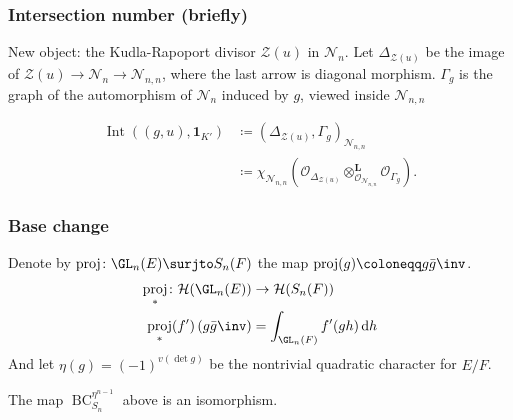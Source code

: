 \documentclass[11pt]{beamer}
\DeclareMathOperator{\BC}{BC}
\DeclareMathOperator{\Int}{Int}
\DeclareMathOperator{\Sat}{Satake}
\DeclareMathOperator{\U}{U}
\DeclareMathOperator{\rproj}{proj}
\newcommand{\HH}{\mathcal{H}}
\newcommand{\VV}{\mathbb{V}}
\newcommand{\RZ}{\mathcal{N}}
\newcommand{\Sheaf}{\mathcal O}
\newcommand{\ZD}{\mathcal{Z}}
\newcommand{\jiao}{\mathop{\otimes}^{\mathbf{L}}} %
\begin{document}
\begin{frame}
  \frametitle{Intersection number (briefly)}
  \begin{itemize}
    \ii New object: the \alert{Kudla-Rapoport divisor $\ZD(u)$} in $\RZ_n$.
    \ii Let $\Delta_{\ZD(u)}$ be the image of $\ZD(u) \to \RZ_n \to \RZ_{n,n}$,
    where the last arrow is diagonal morphism.
    \ii $\Gamma_g$ is the graph of the automorphism of $\RZ_n$ induced by $g$,
    viewed inside $\RZ_{n,n}$
  \end{itemize}
  \begin{definition}
    \begin{align*}
      \Int((g,u), \mathbf{1}_{K'})
      &\coloneqq \left( \Delta_{\ZD(u)}, \Gamma_g \right)_{\RZ_{n,n}} \\
      &\coloneqq \chi_{\RZ_{n,n}}
      \left( \Sheaf_{\Delta_{\ZD(u)}} \jiao_{\Sheaf_{\RZ_{n,n}}} \Sheaf_{\Gamma_g}  \right).
    \end{align*}
  \end{definition}
\end{frame}

\begin{frame}[fragile]
  \frametitle{Base change}
  Denote by $\rproj \colon \GL_n(E) \surjto S_n(F)$ the map $\rproj(g) \coloneqq g \bar{g}\inv$.
  \begin{align*}
    \rproj_\ast \colon \HH(\GL_n(E)) &\to \HH(S_n(F)) \\
    \rproj_\ast(f')\left( g\bar{g}\inv \right) &= \int_{\GL_n(F)} f'(gh) \odif h
  \end{align*}
  And let $\eta(g) = (-1)^{v(\det g)}$ be the nontrivial quadratic character for $E/F$.
  \begin{center}
  \end{center}
  \begin{theorem}
    [Leslie 2023]
    The map $\BC_{S_n}^{\eta^{n-1}}$ above is an isomorphism.
  \end{theorem}
\end{frame}
\end{document}
